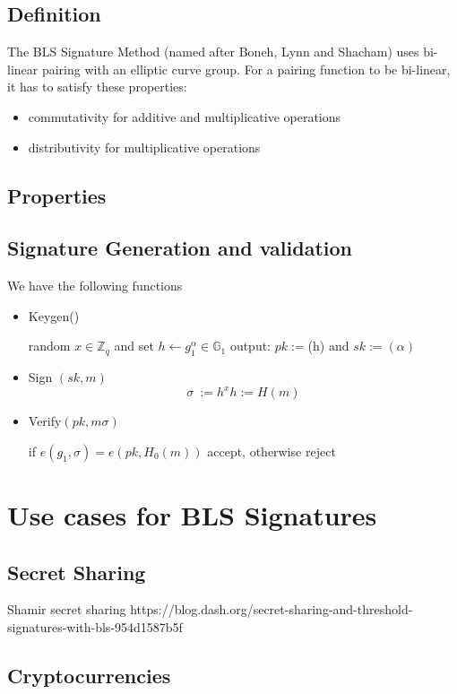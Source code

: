 \documentclass[a4paper,12pt]{scrartcl}
\begin{document}
\subsection{Definition}
The BLS Signature Method (named after Boneh, Lynn and Shacham) uses bi-linear pairing with an elliptic curve group.
\newline
For a pairing function to be bi-linear, it has to satisfy these properties:
\begin{itemize}
	\item commutativity for additive and multiplicative operations
	\item distributivity for multiplicative operations
\end{itemize}

\subsection{Properties}

\subsection{Signature Generation and validation}
We have the following functions
\begin{itemize}
	\item Keygen()
	\begin{center}
		random \( x\in \mathbb{Z}_{q} \) and set \( h \leftarrow g_{1}^\alpha\in \mathbb{G}_{1} \) output: \( pk := \)(h) and \( sk := (\alpha) \)
	\end{center}
	\item Sign \( (sk, m) \)
	\[ \sigma\ := h^x  h := H(m) \]
	\item Verify\( (pk, m \sigma) \)
	\begin{center}
		if \( e(g_{1},\sigma) = e(pk, H_{0}(m)) \) accept, otherwise reject
	\end{center}
\end{itemize}

\pagebreak

\section{Use cases for BLS Signatures}
\subsection{Secret Sharing}
Shamir secret sharing https://blog.dash.org/secret-sharing-and-threshold-signatures-with-bls-954d1587b5f
\subsection{Cryptocurrencies}
\end{document}
